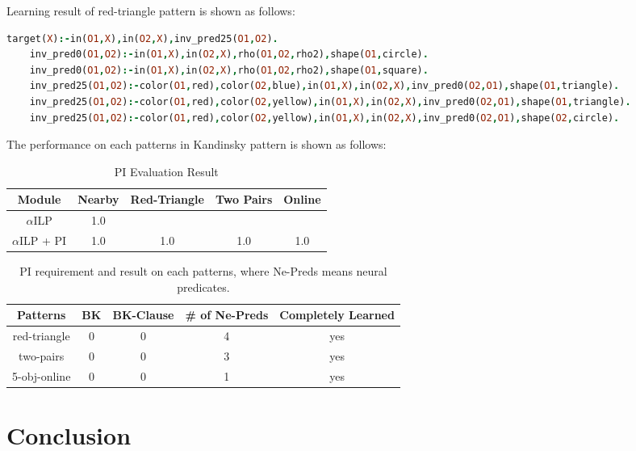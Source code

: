 \documentclass[
]{ceurart}
\begin{document}
Learning result of red-triangle pattern is shown as follows:

\begin{lstlisting}[language=Prolog, mathescape]
	target(X):-in(O1,X),in(O2,X),inv_pred25(O1,O2).
	inv_pred0(O1,O2):-in(O1,X),in(O2,X),rho(O1,O2,rho2),shape(O1,circle).
	inv_pred0(O1,O2):-in(O1,X),in(O2,X),rho(O1,O2,rho2),shape(O1,square).
	inv_pred25(O1,O2):-color(O1,red),color(O2,blue),in(O1,X),in(O2,X),inv_pred0(O2,O1),shape(O1,triangle).
	inv_pred25(O1,O2):-color(O1,red),color(O2,yellow),in(O1,X),in(O2,X),inv_pred0(O2,O1),shape(O1,triangle).
	inv_pred25(O1,O2):-color(O1,red),color(O2,yellow),in(O1,X),in(O2,X),inv_pred0(O2,O1),shape(O2,circle).
\end{lstlisting}


The performance on each patterns in Kandinsky pattern is shown as follows:
\begin{table}
	\caption{PI Evaluation Result}
	\label{tab:nearby-pi-result}
	\begin{tabular}{ccccc}
		\toprule
		Module              & Nearby & Red-Triangle & Two Pairs & Online\\
		\midrule
		$\alpha$ILP 	    & 1.0 	    & 		    & 		    &           \\
		$\alpha$ILP + PI    & 	1.0 	& 1.0	& 1.0	    &  1.0    \\
		\bottomrule
	\end{tabular}
\end{table}



\begin{table}
	\caption{PI requirement and result on each patterns, where Ne-Preds means neural predicates.}
	\label{tab:pi-result}
	\begin{tabular}{ccccc}
		\toprule
		Patterns             & BK & BK-Clause & \# of Ne-Preds & Completely Learned\\
		\midrule
		red-triangle 	    & 0 	    & 	0	    &  4   &   yes        \\
		two-pairs    & 	0 	& 0	& 3	    &  yes    \\
		5-obj-online    & 	0 	& 0	&  	 1   &   yes   \\
		\bottomrule
	\end{tabular}
\end{table}



\section{Conclusion}
\end{document}
